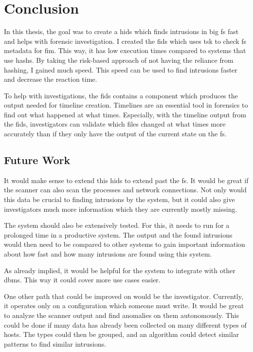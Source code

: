 
\chapter{Conclusion}
\label{sec:Conclusion}
In this thesis, the goal was to create a \gls{hids} which finds intrusions in big \gls{fs} fast and helps with forensic investigation. I created the \gls{fids} which uses \gls{tsk} to check \gls{fs} \gls{metadata} for \gls{fim}. This way, it has low execution times compared to systems that use \glspl{hash}. By taking the risk-based approach of not having the reliance from hashing, I gained much speed. This speed can be used to find intrusions faster and decrease the reaction time. 

To help with investigations, the \gls{fids} contains a component which produces the output needed for timeline creation. Timelines are an essential tool in forensics to find out what happened at what times. Especially, with the timeline output from the \gls{fids}, investigators can validate which files changed at what times more accurately than if they only have the output of the current state on the \gls{fs}. 

\section{Future Work}
\label{sec:future:work}


It would make sense to extend this \gls{hids} to extend past the \gls{fs}. It would be great if the scanner can also scan the processes and network connections. Not only would this data be crucial to finding intrusions by the system, but it could also give investigators much more information which they are currently mostly missing.

The system should also be extensively tested. For this, it needs to run for a prolonged time in a productive system. The output and the found intrusions would then need to be compared to other systems to gain important information about how fast and how many intrusions are found using this system. 

As already implied, it would be helpful for the system to integrate with other \gls{dbms}. This way it could cover more use cases easier. 

One other path that could be improved on would be the investigator. Currently, it operates only on a configuration which someone must write. It would be great to analyze the scanner output and find anomalies on them autonomously. This could be done if many data has already been collected on many different types of hosts. The types could then be grouped, and an algorithm could detect similar patterns to find similar intrusions. 
